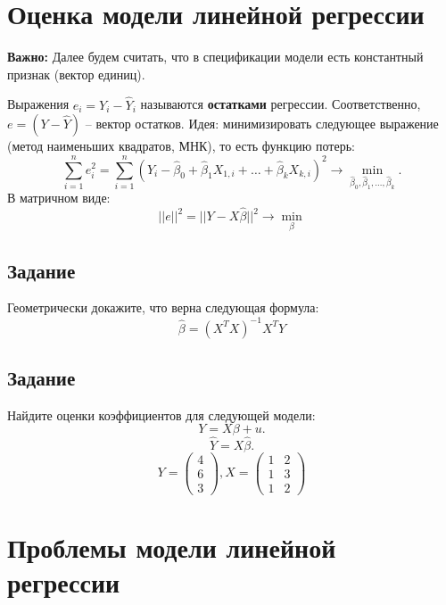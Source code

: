\documentclass[11pt, a4paper]{extarticle}
\begin{document}
\section{Оценка модели линейной регрессии}

\textbf{Важно:} Далее будем считать, что в спецификации модели есть константный признак (вектор единиц). 

Выражения $e_i = Y_i - \hat{Y}_i$ называются \textbf{остатками} регрессии. Соответственно, $e = (Y - \hat{Y})$ – вектор остатков. Идея: минимизировать следующее выражение (метод наименьших квадратов, МНК), то есть функцию потерь:
\[
\sum_{i = 1}^{n} e_i^2 = \sum_{i = 1}^{n} (Y_i - \hat{\beta}_0 + \hat{\beta}_1X_{1, i} + \ldots + \hat{\beta}_kX_{k, i})^2 \rightarrow \min_{\hat{\beta}_0, \hat{\beta}_1, \ldots, \hat{\beta}_k}.
\]
В матричном виде:
\[
||e||^2 = ||Y - X\hat{\beta}||^2 \rightarrow \min_{\beta}
\]

\subsection{Задание}
Геометрически докажите, что верна следующая формула:
\[
\hat{\beta} = (X^{T}X)^{-1}X^{T}Y
\]

\subsection{Задание}
Найдите оценки коэффициентов для следующей модели:
\[
Y = X\beta + u.
\]
\[
\hat{Y} = X\hat{\beta}.
\]
\[
Y = \begin{pmatrix}
4 \\
6 \\ 
3
\end{pmatrix}, X = \begin{pmatrix}
1 & 2 \\
1 & 3 \\
1 & 2
\end{pmatrix}
\]

\section{Проблемы модели линейной регрессии}
\end{document}
